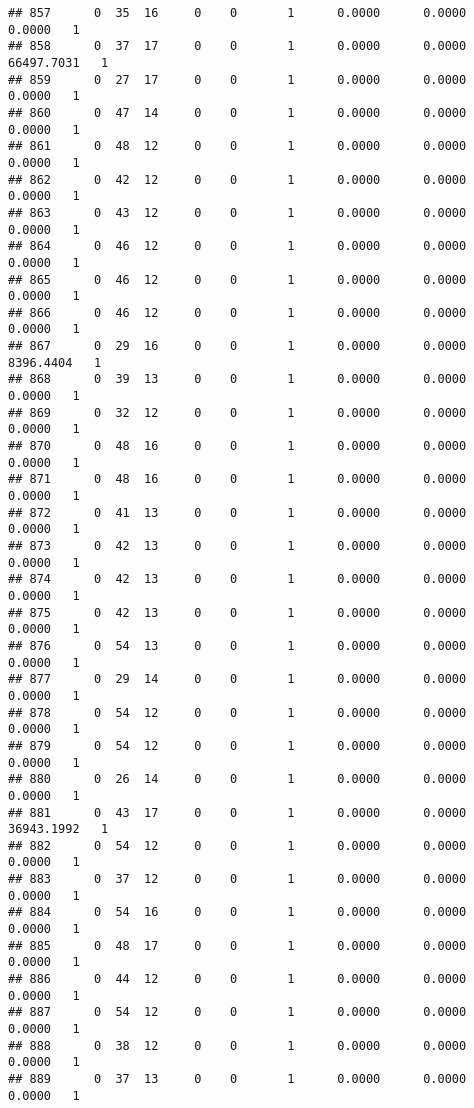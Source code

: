 \documentclass[
]{article}
\begin{document}
\begin{enumerate}
\begin{verbatim}
## 857      0  35  16     0    0       1      0.0000      0.0000      0.0000   1
## 858      0  37  17     0    0       1      0.0000      0.0000  66497.7031   1
## 859      0  27  17     0    0       1      0.0000      0.0000      0.0000   1
## 860      0  47  14     0    0       1      0.0000      0.0000      0.0000   1
## 861      0  48  12     0    0       1      0.0000      0.0000      0.0000   1
## 862      0  42  12     0    0       1      0.0000      0.0000      0.0000   1
## 863      0  43  12     0    0       1      0.0000      0.0000      0.0000   1
## 864      0  46  12     0    0       1      0.0000      0.0000      0.0000   1
## 865      0  46  12     0    0       1      0.0000      0.0000      0.0000   1
## 866      0  46  12     0    0       1      0.0000      0.0000      0.0000   1
## 867      0  29  16     0    0       1      0.0000      0.0000   8396.4404   1
## 868      0  39  13     0    0       1      0.0000      0.0000      0.0000   1
## 869      0  32  12     0    0       1      0.0000      0.0000      0.0000   1
## 870      0  48  16     0    0       1      0.0000      0.0000      0.0000   1
## 871      0  48  16     0    0       1      0.0000      0.0000      0.0000   1
## 872      0  41  13     0    0       1      0.0000      0.0000      0.0000   1
## 873      0  42  13     0    0       1      0.0000      0.0000      0.0000   1
## 874      0  42  13     0    0       1      0.0000      0.0000      0.0000   1
## 875      0  42  13     0    0       1      0.0000      0.0000      0.0000   1
## 876      0  54  13     0    0       1      0.0000      0.0000      0.0000   1
## 877      0  29  14     0    0       1      0.0000      0.0000      0.0000   1
## 878      0  54  12     0    0       1      0.0000      0.0000      0.0000   1
## 879      0  54  12     0    0       1      0.0000      0.0000      0.0000   1
## 880      0  26  14     0    0       1      0.0000      0.0000      0.0000   1
## 881      0  43  17     0    0       1      0.0000      0.0000  36943.1992   1
## 882      0  54  12     0    0       1      0.0000      0.0000      0.0000   1
## 883      0  37  12     0    0       1      0.0000      0.0000      0.0000   1
## 884      0  54  16     0    0       1      0.0000      0.0000      0.0000   1
## 885      0  48  17     0    0       1      0.0000      0.0000      0.0000   1
## 886      0  44  12     0    0       1      0.0000      0.0000      0.0000   1
## 887      0  54  12     0    0       1      0.0000      0.0000      0.0000   1
## 888      0  38  12     0    0       1      0.0000      0.0000      0.0000   1
## 889      0  37  13     0    0       1      0.0000      0.0000      0.0000   1

\end{verbatim}
\end{enumerate}
\end{document}
